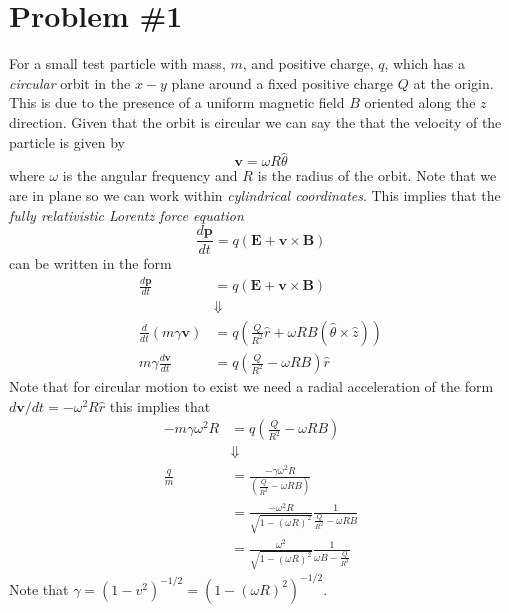 \documentclass[11pt]{article}
\numberwithin{equation}{section}
\begin{document}


\section{Problem \#1}
For a small test particle with mass, $m$, and positive charge, $q$, which has a \emph{circular} orbit in the $x-y$ 
plane around a fixed positive charge $Q$ at the origin. This is due to the presence of a uniform magnetic field
$B$ oriented along the $z$ direction. Given that the orbit is circular we can say the that the velocity 
of the particle is given by
$$\mathbf{v} = \omega{R}\hat{\theta}$$
where $\omega$ is the angular frequency and $R$ is the radius of the orbit. Note that we are in plane so we can work
within \emph{cylindrical coordinates}. This implies that the \emph{fully relativistic Lorentz force equation}
\begin{equation}
    \frac{d\mathbf{p}}{dt} = q\left(\mathbf{E}+\mathbf{v}\times\mathbf{B}\right)
\label{LorFor}
\end{equation}
can be written in the form 
\begin{align*}
    \frac{d\mathbf{p}}{dt} &= q\left(\mathbf{E}+\mathbf{v}\times\mathbf{B}\right) \\
                           &\Downarrow\\
    \frac{d}{dt}(m\gamma{\mathbf{v}}) &= q\left(\frac{Q}{R^2}\hat{r} + \omega{RB}(\hat{\theta}\times\hat{z})\right)\\
    m\gamma\frac{d\mathbf{v}}{dt} &= q\left(\frac{Q}{R^2} - \omega{RB}\right)\hat{r}
\end{align*}
Note that for circular motion to exist we need a radial acceleration of the form $d\mathbf{v}/dt = -\omega^2R\hat{r}$ this 
implies that
\begin{align*}
    -m\gamma\omega^2R &= q\left(\frac{Q}{R^2} - \omega{RB}\right)\\
                     &\Downarrow\\
    \frac{q}{m} &= \frac{-\gamma\omega^2R}{\left(\frac{Q}{R^2} - \omega{RB}\right)}\\
                &= \frac{-\omega^2R}{\sqrt{1-(\omega{R})^2}}\frac{1}{\frac{Q}{R^2} - \omega{RB}}\\
                &= \frac{\omega^2}{\sqrt{1-(\omega{R})^2}}\frac{1}{\omega{B} - \frac{Q}{R^3}}
\end{align*}
Note that $\gamma = (1-v^2)^{-1/2} = (1-(\omega{R})^2)^{-1/2}$.

\pagebreak
\end{document}

